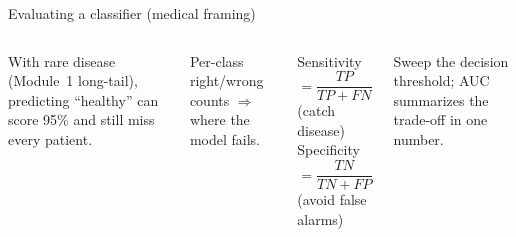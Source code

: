 \documentclass[
11pt,notheorems,hyperref={pdfauthor=whatever}
]{beamer}
\begin{document}
\begin{frame}{Evaluating a classifier (medical framing)}
\small
\begin{columns}[T,onlytextwidth]
    \begin{tcolorbox}[medicalglass, title=\textbf{\color{accTeal}Accuracy is not enough}]
    With rare disease (Module~1 long-tail), predicting ``healthy'' can score 95\% and still
    miss every patient.
    \end{tcolorbox}
    \begin{tcolorbox}[medicalglass, title=\textbf{\color{accGreen}Confusion matrix}]
    Per-class right/wrong counts $\Rightarrow$ where the model fails.
    \end{tcolorbox}

    \begin{tcolorbox}[medicalglass, title=\textbf{\color{accAmber}Sensitivity / Specificity}]
    \small
    Sensitivity $=\dfrac{TP}{TP+FN}$ (catch disease)\\[0.4em]
    Specificity $=\dfrac{TN}{TN+FP}$ (avoid false alarms)
    \end{tcolorbox}
    \begin{tcolorbox}[medicalglass, title=\textbf{\color{accCoral}ROC / AUC}]
    Sweep the decision threshold; AUC summarizes the trade-off in one number.
    \end{tcolorbox}
\end{columns}
\end{frame}
\end{document}
